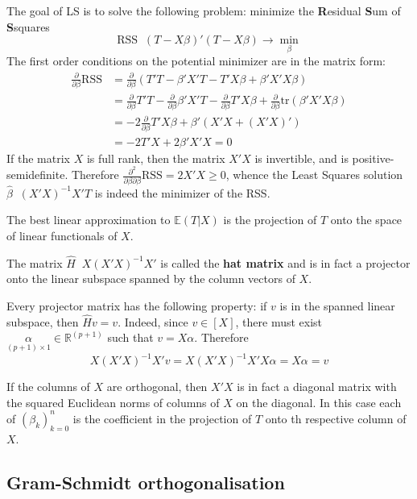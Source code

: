 \documentclass[a4paper]{article}
\newcommand{\clo}[1]{{\left [ #1 \right ]}}
\newcommand{\brac}[1]{{\left ( #1 \right )}}
\newcommand{\induc}[1]{{\left . #1 \right \vert}}
\newcommand{\Real}{\mathbb{R}}
\newcommand{\Ex}[0]{{\mathbb{E}}}
\newcommand{\RSS}{{\text{RSS}}}
\newcommand{\tr}{\text{tr}}
\newcommand{\defn}{\mathop{\overset{\Delta}{=}}\nolimits}
\begin{document}
The goal of LS is to solve the following problem: minimize the \textbf{R}esidual \textbf{S}um of \textbf{S}squares
\[\RSS \defn \brac{T-X\beta}'\brac{T-X\beta} \to \min_\beta\]
The first order conditions on the potential minimizer are in the matrix form:
\begin{align*}
	\frac{\partial}{\partial \beta}\RSS &= \frac{\partial}{\partial \beta}\brac{T'T-\beta'X'T - T'X\beta + \beta'X'X\beta}\\
	&= \frac{\partial}{\partial \beta} T'T - \frac{\partial}{\partial \beta} \beta'X'T - \frac{\partial}{\partial \beta} T'X\beta + \frac{\partial}{\partial \beta} \tr\brac{\beta'X'X\beta}\\
	&= - 2 \frac{\partial}{\partial \beta} T'X\beta + \beta'\brac{X'X + \brac{X'X}'}\\
	&= - 2 T'X + 2 \beta'X'X = 0
\end{align*}
If the matrix $X$ is full rank, then the matrix $X'X$ is invertible, and is positive-semidefinite.
Therefore $\frac{\partial^2}{\partial \beta\partial \beta}\RSS = 2 X'X \geq 0$, whence the Least Squares solution $\hat{\beta} \defn \brac{X'X}^{-1} X'T$ is indeed the minimizer of the RSS.

The best linear approximation to $\Ex\brac{\induc{T}X}$ is the projection of $T$ onto the space of linear functionals of $X$.

The matrix $\hat{H} \defn X\brac{X'X}^{-1}X'$ is called the \textbf{hat matrix} and is in fact a projector onto the linear subspace spanned by the column vectors of $X$.

Every projector matrix has the following property: if $v$ is in the spanned linear subspace, then $\hat{H}v = v$.
Indeed, since $v\in \clo{X}$, there must exist $\underset{(p+1)\times 1}{\alpha}\in \Real^{(p+1)}$ such that $v = X\alpha$.
Therefore
\[X\brac{X'X}^{-1}X'v = X\brac{X'X}^{-1}X'X\alpha = X\alpha = v\]

If the columns of $X$ are orthogonal, then $X'X$ is in fact a diagonal matrix with the squared Euclidean norms of columns of $X$ on the diagonal.
In this case each of $\brac{\beta_k}_{k=0}^n$ is the coefficient in the projection of $T$ onto th respective column of $X$.


\subsection*{Gram-Schmidt orthogonalisation} %
\label{sub:gram_schmidt_orthogonalisation}
\end{document}
